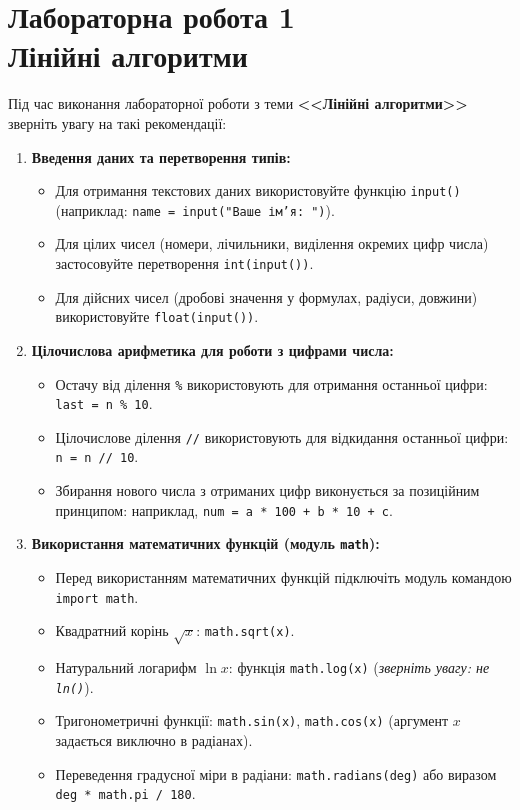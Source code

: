 
\chapter{Лабораторна робота 1\\ Лінійні алгоритми}
Під час виконання лабораторної роботи з теми \textbf{<<Лінійні алгоритми>>} зверніть увагу на такі рекомендації:
\begin{enumerate}[label=\arabic*.]
	\item \textbf{Введення даних та перетворення типів:}
	\begin{itemize}
		\item Для отримання текстових даних використовуйте функцію \texttt{input()} (наприклад: \texttt{name = input("Ваше ім'я: ")}).
		\item Для цілих чисел (номери, лічильники, виділення окремих цифр числа) застосовуйте перетворення \texttt{int(input())}.
		\item Для дійсних чисел (дробові значення у формулах, радіуси, довжини) використовуйте \texttt{float(input())}.
	\end{itemize}
	\item \textbf{Цілочислова арифметика для роботи з цифрами числа:}
	\begin{itemize}
		\item Остачу від ділення \texttt{\%} використовують для отримання останньої цифри: \texttt{last = n \% 10}.
		\item Цілочислове ділення \texttt{//} використовують для відкидання останньої цифри: \texttt{n = n // 10}.
		\item Збирання нового числа з отриманих цифр виконується за позиційним принципом: наприклад, \texttt{num = a * 100 + b * 10 + c}.
	\end{itemize}
	\item \textbf{Використання математичних функцій (модуль \texttt{math}):}
	\begin{itemize}
		\item Перед використанням математичних функцій підключіть модуль командою \texttt{import math}.
		\item Квадратний корінь $\sqrt{x}$: \texttt{math.sqrt(x)}.
		\item Натуральний логарифм $\ln x$: функція \texttt{math.log(x)} (\textit{зверніть увагу: не \texttt{ln()}}).
		\item Тригонометричні функції: \texttt{math.sin(x)}, \texttt{math.cos(x)} (аргумент $x$ задається виключно в радіанах).
		\item Переведення градусної міри в радіани: \texttt{math.radians(deg)} або виразом \texttt{deg * math.pi / 180}.

\end{itemize}
\end{enumerate}
